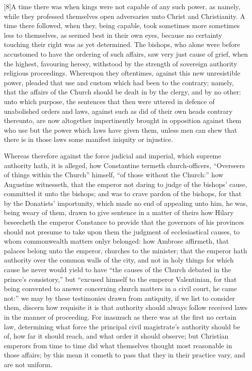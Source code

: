 [8]A time there was when kings were not capable of any such power, as namely, while they professed themselves open adversaries unto Christ and Christianity. A time there followed, when they, being capable, took sometimes more sometimes less to themselves, as seemed best in their own eyes, because no certainty touching their right was as yet determined. The bishops, who alone were before accustomed to have the ordering of such affairs, saw very just cause of grief, when the highest, favouring heresy, withstood by the strength of sovereign authority religious proceedings. Whereupon they oftentimes, against this new unresistible power, pleaded that use and custom which had been to the contrary; namely, that the affairs of the Church should be dealt in by the clergy, and by no other: unto which purpose, the sentences that then were uttered in defence of unabolished orders and laws, against such as did of their own heads contrary thereunto, are now altogether impertinently brought in opposition against them who use but the power which laws have given them, unless men can shew that there is in those laws some manifest iniquity or injustice.

Whereas therefore against the force judicial and imperial, which supreme authority hath, it is alleged, how Constantine termeth church-officers, “Overseers of things within the  Church” himself, “of those without the Church:” how Augustine witnesseth, that the emperor not daring to judge of the bishops’ cause, committed it unto the bishops; and was to crave pardon of the bishops, for that by the Donatists’ importunity, which made no end of appealing unto him, he was, being weary of them, drawn to give sentence in a matter of theirs how Hilary beseecheth the emperor Constance to provide that the governors of his provinces should not presume to take upon them the judgment of ecclesiastical causes, to whom commonwealth matters onlyr belonged: how Ambrose affirmeth, that palaces belong unto the emperor,  churches to the minister; that the emperor hath authority over the common walls of the city, and not in holy things for which cause he never would yield to have “the causes of the Church debated in the prince’s consistory,” but “excused himself to the emperor Valentinian, for that being convented to answer concerning church matters in a civil court, he came not:” we may by these testimonies drawn from antiquity, if we list to consider them, discern how requisite it is that authority should always follow received laws in the manner of proceeding. For inasmuch as there was at the first no certain law, determining what force the principal civil magistrate’s authority should be of, how far it should reach, and what order it should observe; but Christian emperors from time to time did what themselves thought most reasonable in those affairs; by this mean it cometh to pass that they in their practice vary, and are not uniform.

